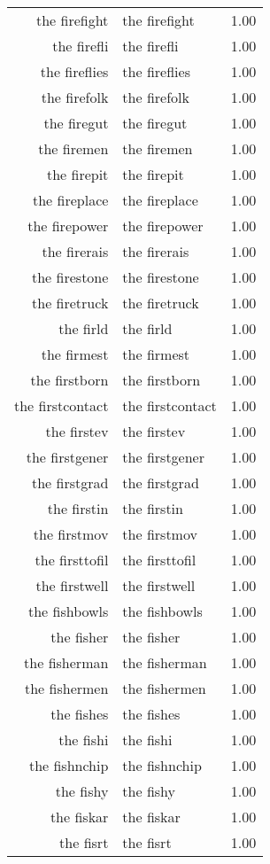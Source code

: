 \begin{table}[ht]
\begin{tabular}{rlr}
  the firefight & the firefight & 1.00 \\ 
  the firefli & the firefli & 1.00 \\ 
  the fireflies & the fireflies & 1.00 \\ 
  the firefolk & the firefolk & 1.00 \\ 
  the firegut & the firegut & 1.00 \\ 
  the firemen & the firemen & 1.00 \\ 
  the firepit & the firepit & 1.00 \\ 
  the fireplace & the fireplace & 1.00 \\ 
  the firepower & the firepower & 1.00 \\ 
  the firerais & the firerais & 1.00 \\ 
  the firestone & the firestone & 1.00 \\ 
  the firetruck & the firetruck & 1.00 \\ 
  the firld & the firld & 1.00 \\ 
  the firmest & the firmest & 1.00 \\ 
  the firstborn & the firstborn & 1.00 \\ 
  the firstcontact & the firstcontact & 1.00 \\ 
  the firstev & the firstev & 1.00 \\ 
  the firstgener & the firstgener & 1.00 \\ 
  the firstgrad & the firstgrad & 1.00 \\ 
  the firstin & the firstin & 1.00 \\ 
  the firstmov & the firstmov & 1.00 \\ 
  the firsttofil & the firsttofil & 1.00 \\ 
  the firstwell & the firstwell & 1.00 \\ 
  the fishbowls & the fishbowls & 1.00 \\ 
  the fisher & the fisher & 1.00 \\ 
  the fisherman & the fisherman & 1.00 \\ 
  the fishermen & the fishermen & 1.00 \\ 
  the fishes & the fishes & 1.00 \\ 
  the fishi & the fishi & 1.00 \\ 
  the fishnchip & the fishnchip & 1.00 \\ 
  the fishy & the fishy & 1.00 \\ 
  the fiskar & the fiskar & 1.00 \\ 
  the fisrt & the fisrt & 1.00 \\ 

\end{tabular}
\end{table}
